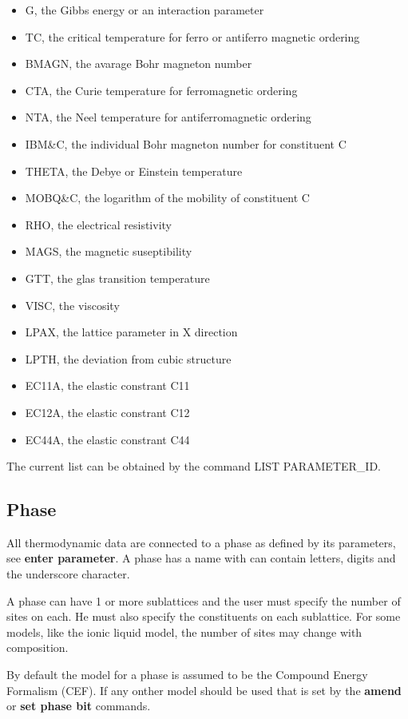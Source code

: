 \documentclass[12pt]{article}
\begin{document}
\begin{itemize}
\item G, the Gibbs energy or an interaction parameter
\item TC, the critical temperature for ferro or antiferro magnetic ordering
\item BMAGN, the avarage Bohr magneton number
\item CTA, the Curie temperature for ferromagnetic ordering
\item NTA, the Neel temperature for antiferromagnetic ordering
\item IBM\&C, the individual Bohr magneton number for constituent C
\item THETA, the Debye or Einstein temperature
\item MOBQ\&C, the logarithm of the mobility of constituent C
\item RHO, the electrical resistivity
\item MAGS, the magnetic suseptibility
\item GTT, the glas transition temperature
\item VISC, the viscosity
\item LPAX, the lattice parameter in X direction
\item LPTH, the deviation from cubic structure
\item EC11A, the elastic constrant C11
\item EC12A, the elastic constrant C12
\item EC44A, the elastic constrant C44
\end{itemize}

The current list can be obtained by the command LIST PARAMETER\_ID.

\subsection{Phase}

All thermodynamic data are connected to a phase as defined by its
parameters, see {\bf enter parameter}.  A phase has a name with can
contain letters, digits and the underscore character.

A phase can have 1 or more sublattices and the user must specify the
number of sites on each.  He must also specify the constituents on
each sublattice.  For some models, like the ionic liquid model, the
number of sites may change with composition.

By default the model for a phase is assumed to be the Compound Energy
Formalism (CEF).  If any onther model should be used that is set by
the {\bf amend} or {\bf set phase bit} commands.
\end{document}
